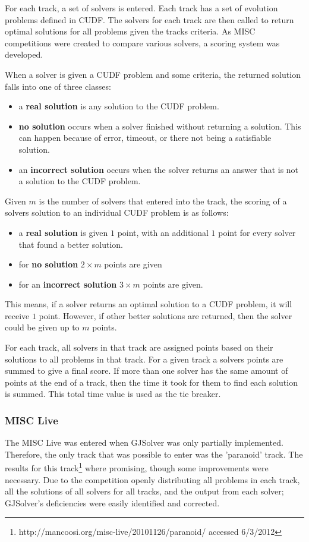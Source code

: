 For each track, a set of solvers is entered.
Each track has a set of evolution problems defined in CUDF.
The solvers for each track are then called to return optimal solutions for all problems given the tracks criteria.
As MISC competitions were created to compare various solvers, a scoring system was developed. 

When a solver is given a CUDF problem and some criteria, the returned solution falls into one of three classes:
\begin{itemize}
  \item a \textbf{real solution} is any solution to the CUDF problem.
  \item \textbf{no solution} occurs when a solver finished without returning a solution. This can happen because of error, timeout, or there not being a satisfiable solution.
  \item an \textbf{incorrect solution} occurs when the solver returns an answer that is not a solution to the CUDF problem.
\end{itemize}

Given $m$ is the number of solvers that entered into the track, the scoring of a solvers solution to an individual CUDF problem is as follows:
\begin{itemize}
  \item a \textbf{real solution} is given $1$ point, with an additional $1$ point for every solver that found a better solution.
  \item for \textbf{no solution} $2\times m$ points are given
  \item for an \textbf{incorrect solution} $3 \times m$ points are given.
\end{itemize}
This means, if a solver returns an optimal solution to a CUDF problem, it will receive $1$ point.
However, if other better solutions are returned, then the solver could be given up to $m$ points.

For each track, all solvers in that track are assigned points based on their solutions to all problems in that track.
For a given track a solvers points are summed to give a final score.
If more than one solver has the same amount of points at the end of a track, then the time it took for them to find each solution is summed.
This total time value is used as the tie breaker.

\subsubsection{MISC Live}
The MISC Live was entered when GJSolver was only partially implemented.
Therefore, the only track that was possible to enter was the 'paranoid' track.
The results for this track\footnote{http://mancoosi.org/misc-live/20101126/paranoid/ accessed 6/3/2012} where promising, though some improvements were necessary.
Due to the competition openly distributing all problems in each track, all the solutions of all solvers for all tracks, 
and the output from each solver;
GJSolver's deficiencies were easily identified and corrected.


